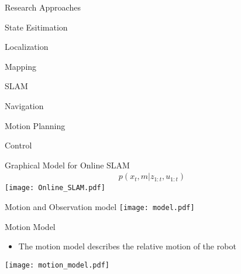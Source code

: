 \documentclass{beamer}
\begin{document}
\begin{frame}{Research Approaches}
\begin{multicols}{2}
\begin{tcolorbox}[colback=green!5!white,colframe=green!75!black]
\centering
State Esitimation
\end{tcolorbox}
\begin{tcolorbox}[colback=green!5!white,colframe=green!75!black]
\centering
Localization
\end{tcolorbox}
\begin{tcolorbox}[colback=green!5!white,colframe=green!75!black]
\centering
Mapping
\end{tcolorbox}
\begin{tcolorbox}[colback=green!5!white,colframe=green!75!black]
\centering
SLAM
\end{tcolorbox}
\begin{tcolorbox}[colback=green!5!white,colframe=green!75!black]
\centering
Navigation
\end{tcolorbox}
\begin{tcolorbox}[colback=green!5!white,colframe=green!75!black]
\centering
Motion Planning
\end{tcolorbox}
\begin{tcolorbox}[colback=green!5!white,colframe=green!75!black]
\centering
Control
\end{tcolorbox}
\end{multicols}
\end{frame}

\begin{frame}[t]{Graphical Model for Online SLAM}
\begin{align*}
p(x_t,m | z_{1:t}, u_{1:t})
\end{align*}
\centering
\texttt{[image: Online\_SLAM.pdf]}
\end{frame}

\begin{frame}{Motion and Observation model}\vspace{5pt}
\centering
\texttt{[image: model.pdf]}
\end{frame}

\begin{frame}{Motion Model}
\begin{itemize}
\item The motion model describes the relative motion of the robot
\end{itemize}
\centering
\texttt{[image: motion\_model.pdf]}
\end{frame}
\end{document}
